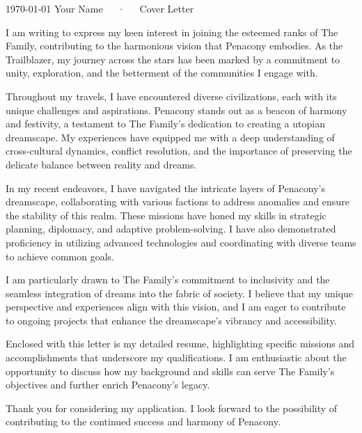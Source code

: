 \documentclass[11pt, a4paper]{plain-awesome-cv}
\begin{document}
\makecvheader[R]

\makecvfooter
  {\today}
  {Your Name~~~·~~~Cover Letter}
  {}

\makelettertitle

\begin{cvletter}

I am writing to express my keen interest in joining the esteemed ranks of The Family, contributing to the harmonious vision that Penacony embodies. As the Trailblazer, my journey across the stars has been marked by a commitment to unity, exploration, and the betterment of the communities I engage with.

Throughout my travels, I have encountered diverse civilizations, each with its unique challenges and aspirations. Penacony stands out as a beacon of harmony and festivity, a testament to The Family's dedication to creating a utopian dreamscape. My experiences have equipped me with a deep understanding of cross-cultural dynamics, conflict resolution, and the importance of preserving the delicate balance between reality and dreams.

In my recent endeavors, I have navigated the intricate layers of Penacony's dreamscape, collaborating with various factions to address anomalies and ensure the stability of this realm. These missions have honed my skills in strategic planning, diplomacy, and adaptive problem-solving. I have also demonstrated proficiency in utilizing advanced technologies and coordinating with diverse teams to achieve common goals.

I am particularly drawn to The Family's commitment to inclusivity and the seamless integration of dreams into the fabric of society. I believe that my unique perspective and experiences align with this vision, and I am eager to contribute to ongoing projects that enhance the dreamscape's vibrancy and accessibility.

Enclosed with this letter is my detailed resume, highlighting specific missions and accomplishments that underscore my qualifications. I am enthusiastic about the opportunity to discuss how my background and skills can serve The Family's objectives and further enrich Penacony's legacy.

Thank you for considering my application. I look forward to the possibility of contributing to the continued success and harmony of Penacony.




\end{cvletter}


\makeletterclosing
\end{document}
